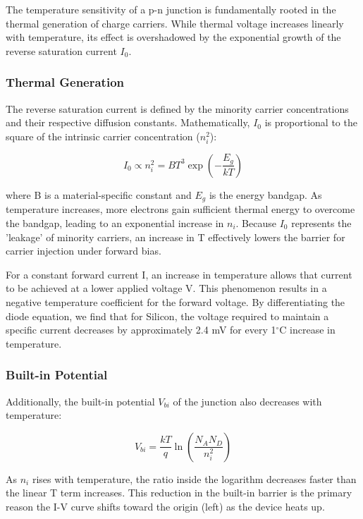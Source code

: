 \documentclass[1pt]{article}
\begin{document}
The temperature sensitivity of a p-n junction is fundamentally rooted in the thermal generation of charge carriers. While thermal voltage increases linearly with temperature, its effect is overshadowed by the exponential growth of the reverse saturation current $I_0$.

\subsubsection{Thermal Generation}

The reverse saturation current is defined by the minority carrier concentrations and their respective diffusion constants. Mathematically, $I_0$ is proportional to the square of the intrinsic carrier concentration ($n_i^2$):

\begin{equation}
I_0 \propto n_i^2 = B T^3 \exp\left(-\frac{E_g}{kT}\right)
\end{equation}

where B is a material-specific constant and $E_g$ is the energy bandgap. As temperature increases, more electrons gain sufficient thermal energy to overcome the bandgap, leading to an exponential increase in $n_i$. Because $I_0$ represents the 'leakage' of minority carriers, an increase in T effectively lowers the barrier for carrier injection under forward bias.

For a constant forward current I, an increase in temperature allows that current to be achieved at a lower applied voltage V. This phenomenon results in a negative temperature coefficient for the forward voltage. By differentiating the diode equation, we find that for Silicon, the voltage required to maintain a specific current decreases by approximately 2.4 mV for every 1$^{\circ}$C increase in temperature.


\subsubsection{Built-in Potential}

Additionally, the built-in potential $V_{bi}$ of the junction also decreases with temperature:

\begin{equation} \label{built-in-voltage}
V_{bi} = \frac{kT}{q} \ln\left(\frac{N_A N_D}{n_i^2}\right)
\end{equation}

As $n_i$ rises with temperature, the ratio inside the logarithm decreases faster than the linear T term increases. This reduction in the built-in barrier is the primary reason the I-V curve shifts toward the origin (left) as the device heats up.
\end{document}

